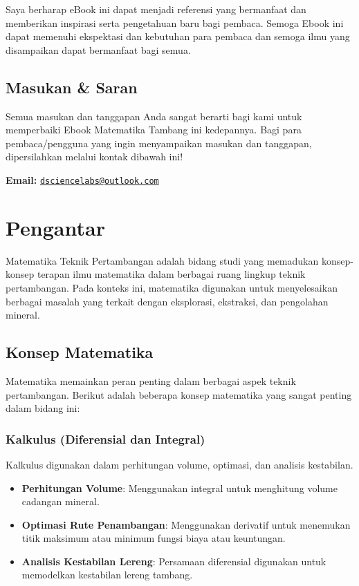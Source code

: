 \documentclass[
]{book}
\providecommand{\tightlist}{%
  \setlength{\itemsep}{0pt}\setlength{\parskip}{0pt}}
\begin{document}
Saya berharap eBook ini dapat menjadi referensi yang bermanfaat dan memberikan inspirasi serta pengetahuan baru bagi pembaca. Semoga Ebook ini dapat memenuhi ekspektasi dan kebutuhan para pembaca dan semoga ilmu yang disampaikan dapat bermanfaat bagi semua.

\section*{Masukan \& Saran}\label{masukan-saran}

Semua masukan dan tanggapan Anda sangat berarti bagi kami untuk memperbaiki Ebook Matematika Tambang ini kedepannya. Bagi para pembaca/pengguna yang ingin menyampaikan masukan dan tanggapan, dipersilahkan melalui kontak dibawah ini!

\textbf{Email:} \href{mailto:dsciencelabs@outlook.com}{\nolinkurl{dsciencelabs@outlook.com}}

\chapter{Pengantar}\label{pengantar}

Matematika Teknik Pertambangan adalah bidang studi yang memadukan konsep-konsep terapan ilmu matematika dalam berbagai ruang lingkup teknik pertambangan. Pada konteks ini, matematika digunakan untuk menyelesaikan berbagai masalah yang terkait dengan eksplorasi, ekstraksi, dan pengolahan mineral.

\section{Konsep Matematika}\label{konsep-matematika}

Matematika memainkan peran penting dalam berbagai aspek teknik pertambangan. Berikut adalah beberapa konsep matematika yang sangat penting dalam bidang ini:

\subsection{Kalkulus (Diferensial dan Integral)}\label{kalkulus-diferensial-dan-integral}

Kalkulus digunakan dalam perhitungan volume, optimasi, dan analisis kestabilan.

\begin{itemize}
\tightlist
\item
  \textbf{Perhitungan Volume}: Menggunakan integral untuk menghitung volume cadangan mineral.
\item
  \textbf{Optimasi Rute Penambangan}: Menggunakan derivatif untuk menemukan titik maksimum atau minimum fungsi biaya atau keuntungan.
\item
  \textbf{Analisis Kestabilan Lereng}: Persamaan diferensial digunakan untuk memodelkan kestabilan lereng tambang.
\end{itemize}
\end{document}
